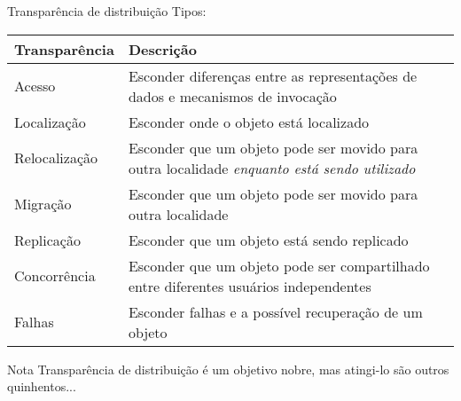\documentclass[Ligatures=TeX,table,brazil,svgnames,usetotalslideindicator,compress,10pt]{beamer}
\begin{document}
\begin{frame}{Transparência de distribuição}
  Tipos:
  \small
  \begin{center}
    \renewcommand{\arraystretch}{1.2}
    {\footnotesize\sffamily
      \begin{tabular}{|l|b{8cm}|} \hline
        \alert{Transparência} & \alert{Descrição} \\ \hline\hline
        Acesso &
            Esconder diferenças entre as representações de dados e mecanismos de invocação \\
	    \hline
        Localização &
	    Esconder onde o objeto está localizado \\
	    \hline
        Relocalização &
            Esconder que um objeto pode ser movido para outra localidade \emph{enquanto está sendo utilizado} \\
	    \hline
        Migração &
            Esconder que um objeto pode ser movido para outra localidade \\
	    \hline
        Replicação &
	    Esconder que um objeto está sendo replicado \\
	    \hline
        Concorrência &
            Esconder que um objeto pode ser compartilhado entre diferentes usuários independentes \\
	    \hline
        Falhas &
            Esconder falhas e a possível recuperação de um objeto \\
	    \hline
    \end{tabular}}
  \end{center}
  \begin{alertblock}{Nota}
    Transparência de distribuição é um objetivo nobre, mas atingi-lo são outros quinhentos...
  \end{alertblock}

\end{frame}
\end{document}
